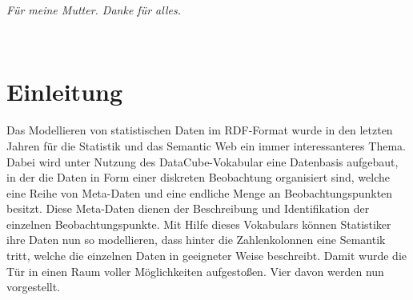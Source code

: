 \documentclass[11pt]{article}
\begin{document}
\vfill
\noindent\begin{minipage}[t]{.49\linewidth}\end{minipage}\hfill
\begin{minipage}[t]{7cm}
\textit{Für meine Mutter. Danke für alles.}
\end{minipage}\par

%
%
\newpage
\tableofcontents

%
%
%
\newpage\thispagestyle{empty}~ 
\newpage


\section{Einleitung}

Das Modellieren von statistischen Daten im RDF-Format wurde in den letzten Jahren für die Statistik und das Semantic Web ein immer interessanteres Thema. Dabei wird unter Nutzung des DataCube-Vokabular\cite{DATACUBE-SPEC} eine Datenbasis aufgebaut, in der die Daten in Form einer diskreten Beobachtung organisiert sind, welche eine Reihe von Meta-Daten und eine endliche Menge an Beobachtungspunkten besitzt. Diese Meta-Daten dienen der Beschreibung und Identifikation der einzelnen Beobachtungspunkte. Mit Hilfe dieses Vokabulars können Statistiker ihre Daten nun so modellieren, dass hinter die Zahlenkolonnen eine Semantik tritt, welche die einzelnen Daten in geeigneter Weise beschreibt. Damit wurde die Tür in einen Raum voller Möglichkeiten aufgestoßen. Vier davon werden nun vorgestellt.
\end{document}
